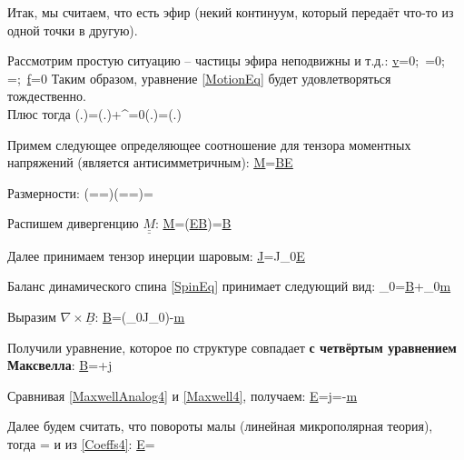 \documentclass[main.tex]{subfiles}
\begin{document}
Итак, мы считаем, что есть эфир (некий континуум, который передаёт что-то из одной точки в другую).

Рассмотрим простую ситуацию -- частицы эфира неподвижны и т.д.:
\beq
\underline{v}=0;\,\,\,\underline{\underline{\sigma}}=0;\,\,\,\rho=;\,\,\,\underline{f}=0
\eeq
Таким образом, уравнение \eqref{MotionEq} будет удовлетворяться тождественно.\\

Плюс тогда
\beq
{}\left(.\right)=\left(.\right)+^{=0}\cdot\nabla\left(.\right)=\left(.\right)
\eeq

Примем следующее определяющее соотношение для тензора моментных напряжений (является антисимметричным):
\beq\label{MDef}
\underline{\underline{M}}=\mu\underline{B}\times\underline{\underline{E}}
\eeq

Размерности:
\beq
\left(==\right)\left(=\cdot{}=\right)\Rightarrow\left[\mu\right]=
\eeq

Распишем дивергенцию $\underline{\underline{M}}$:
\beq
\nabla\cdot\underline{\underline{M}}=\mu\nabla\cdot\left(\underline{\underline{E}}\times\underline{B}\right)=\mu\nabla\times\underline{B}
\eeq

Далее принимаем тензор инерции шаровым:
\beq
\underline{\underline{J}}=J_0\underline{\underline{E}}
\eeq

Баланс динамического спина \eqref{SpinEq} принимает следующий вид:
\beq
\rho_0=\mu\nabla\times\underline{B}+\rho_0\underline{m}
\eeq

Выразим $\nabla\times\underline{B}$:
\beq\label{MaxwellAnalog4}
\nabla\times\underline{B}=\left(\rho_0J_0\underline{\omega}\right)-\underline{m}
\eeq

Получили уравнение, которое по структуре совпадает \textbf{с четвёртым уравнением Максвелла}:
\beq\label{Maxwell4}
\nabla\times\underline{B}=+\underline{j}
\eeq

Сравнивая \eqref{MaxwellAnalog4} и \eqref{Maxwell4}, получаем:
\beq\label{Coeffs4}
\underline{E}=\underline{\omega}\underline{j}=-\underline{m}
\eeq

Далее будем считать, что повороты малы (линейная микрополярная теория), тогда
\beq
\underline{\omega}=
\eeq
и из \eqref{Coeffs4}:
\beq\label{E}
\underline{E}=
\eeq
\end{document}

